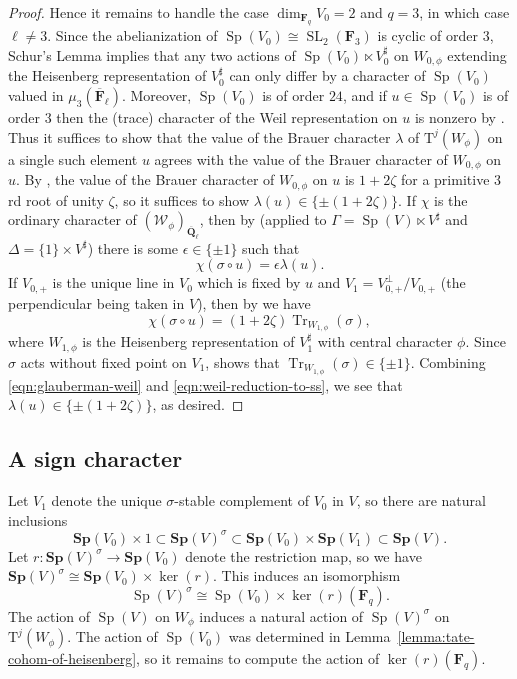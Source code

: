 \documentclass[reqno]{amsart}
\numberwithin{equation}{subsection}
\newcommand{\F}{\mathbf{F}}
\newcommand{\Q}{\mathbf{Q}}
\newcommand{\ol}[1]{\overline{#1}}
\newcommand\cW{\mathcal{W}}
\DeclareMathOperator{\SL}{SL}
\DeclareMathOperator{\Tr}{Tr}
\DeclareMathOperator{\Sp}{Sp}
\newcommand{\rT}{\ensuremath{\mathrm{T}}\xspace}
\theoremstyle{remark}
\numberwithin{equation}{subsection}
\numberwithin{figure}{subsection}
\begin{document}
\begin{proof}
Hence it remains to handle the case $\dim_{\F_q} V_0 = 2$ and $q = 3$, in which case $\ell \neq 3$. Since the abelianization of $\Sp(V_0) \cong \SL_2(\F_3)$ is cyclic of order $3$, Schur's Lemma implies that any two actions of $\Sp(V_0) \ltimes V_0^\sharp$ on $W_{0,\phi}$ extending the Heisenberg representation of $V_0^\sharp$ can only differ by a character of $\Sp(V_0)$ valued in $\mu_3(\ol\F_\ell)$. Moreover, $\Sp(V_0)$ is of order $24$, and if $u \in \Sp(V_0)$ is of order $3$ then the (trace) character of the Weil representation on $u$ is nonzero by \cite[Theorem 4.4]{Ger77}. Thus it suffices to show that the value of the Brauer character $\lambda$ of $\rT^j(W_\phi)$ on a single such element $u$ agrees with the value of the Brauer character of $W_{0,\phi}$ on $u$. By \cite[Theorem 4.9.1(c)]{Ger77}, the value of the Brauer character of $W_{0,\phi}$ on $u$ is $1+2\zeta$ for a primitive $3$rd root of unity $\zeta$, so it suffices to show $\lambda(u) \in \{\pm (1+2\zeta)\}$. If $\chi$ is the ordinary character of $(\cW_\phi)_{\ol\Q_\ell}$, then by \cite[Theorem~3.5.4]{Cot26b} (applied to $\Gamma = \Sp(V) \ltimes V^\sharp$ and $\Delta = \{1\} \times V^\sharp$) there is some $\epsilon \in \{\pm 1\}$ such that
\begin{equation}\label{eqn:glauberman-weil}
    \chi(\sigma \circ u) = \epsilon \lambda(u).
\end{equation}
If $V_{0,+}$ is the unique line in $V_0$ which is fixed by $u$ and $V_1 = V_{0,+}^\perp/V_{0,+}$ (the perpendicular being taken in $V$), then by \cite[Theorem 4.9.1(c)]{Ger77} we have
\begin{equation}\label{eqn:weil-reduction-to-ss}
    \chi(\sigma \circ u) = (1+2\zeta)\Tr_{W_{1,\phi}}(\sigma),
\end{equation}
where $W_{1,\phi}$ is the Heisenberg representation of $V_1^\sharp$ with central character $\phi$. Since $\sigma$ acts without fixed point on $V_1$, \cite[Theorem 4.9.1(a)]{Ger77} shows that $\Tr_{W_{1,\phi}}(\sigma) \in \{\pm 1\}$. Combining \eqref{eqn:glauberman-weil} and \eqref{eqn:weil-reduction-to-ss}, we see that $\lambda(u) \in \{\pm (1+2\zeta)\}$, as desired.
\end{proof}

\subsection{A sign character}
Let $V_1$ denote the unique $\sigma$-stable complement of $V_0$ in $V$, so there are natural inclusions
\[
\mathbf{Sp}(V_0) \times 1 \subset \mathbf{Sp}(V)^\sigma \subset \mathbf{Sp}(V_0) \times \mathbf{Sp}(V_1) \subset \mathbf{Sp}(V).
\]
Let $r\colon \mathbf{Sp}(V)^\sigma \to \mathbf{Sp}(V_0)$ denote the restriction map, so we have $\mathbf{Sp}(V)^\sigma \cong \mathbf{Sp}(V_0) \times \ker(r)$. This induces an isomorphism 
\begin{equation}\label{eq:Sp-fixed}
\Sp(V)^\sigma \cong \Sp(V_0) \times \ker(r)(\F_q).
\end{equation}
The action of $\Sp(V)$ on $W_\phi$ induces a natural action of $\Sp(V)^\sigma $ on $\rT^j(W_\phi)$. The action of $\Sp(V_0)$ was determined in Lemma~\ref{lemma:tate-cohom-of-heisenberg}, so it remains to compute the action of $\ker(r)(\F_q)$. 
\end{document}
